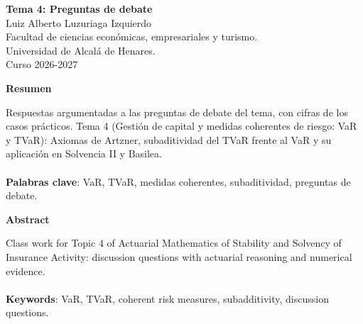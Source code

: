 \documentclass[a4paper,12pt]{article}
\begin{document}
\begin{titlepage}
    \centering
    \vspace*{0.1cm}
    \huge\textbf{Tema 4: Preguntas de debate}\\
    \vspace{1cm}
    \small{Luiz Alberto Luzuriaga Izquierdo}\\
    \vspace{0.1cm}
    Facultad de ciencias económicas, empresariales y turismo. \\
    \vspace{0.1cm}
    Universidad de Alcalá de Henares. \\
    \vspace{0.1cm}
    Curso 2026-2027\\
    \vspace{0.5cm}

{\bfseries Resumen}

\vspace{0.1cm}
\noindent
\begin{justify}
Respuestas argumentadas a las preguntas de debate del tema, con cifras de los casos prácticos. Tema 4 (Gestión de capital y medidas coherentes de riesgo: VaR y TVaR): Axiomas de Artzner, subaditividad del TVaR frente al VaR y su aplicación en Solvencia II y Basilea.\\\\
\vspace{0.1cm}
\noindent
\textbf{Palabras clave}: VaR, TVaR, medidas coherentes, subaditividad, preguntas de debate.
\end{justify}
\begin{center}
    {\bfseries Abstract}
\end{center}
\vspace{0.1cm}
\noindent
\begin{justify}
Class work for Topic 4 of Actuarial Mathematics of Stability and Solvency of Insurance Activity: discussion questions with actuarial reasoning and numerical evidence.\\\\
\vspace{0.1cm}
\noindent
\textbf{Keywords}: VaR, TVaR, coherent risk measures, subadditivity, discussion questions.
\end{justify}

\end{titlepage}

\newpage{}
\renewcommand{\contentsname}{Índice}
\tableofcontents
\end{document}
